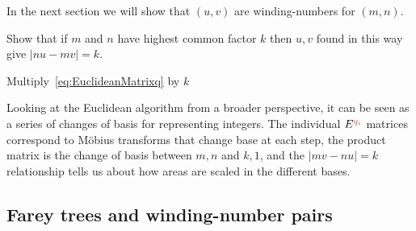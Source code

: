 In the next section we will show that $(u,v)$ are winding-numbers for $(m,n)$. 


%


\begin{jExercise}
	Show that if $m$ and $n$ have highest common factor $k$ then $u,v$ found in this way give $|nu-mv|=k$.
\end{jExercise}
\begin{jAnswer}
	Multiply~\eqref{eq:EuclideanMatrixq} by $k$
\end{jAnswer}


Looking at the Euclidean algorithm from a broader perspective, it can  be seen as a series of changes of basis for representing integers. The individual $E^{\jqi}$ matrices correspond to  M\"obius transforms that change base at each step, the product matrix is the change of basis between $m,n$ and $k,1$, and the $ |mv - nu|=k$ relationship tells us about how areas are scaled in the different bases. 

\subsection{Farey trees and winding-number pairs}

